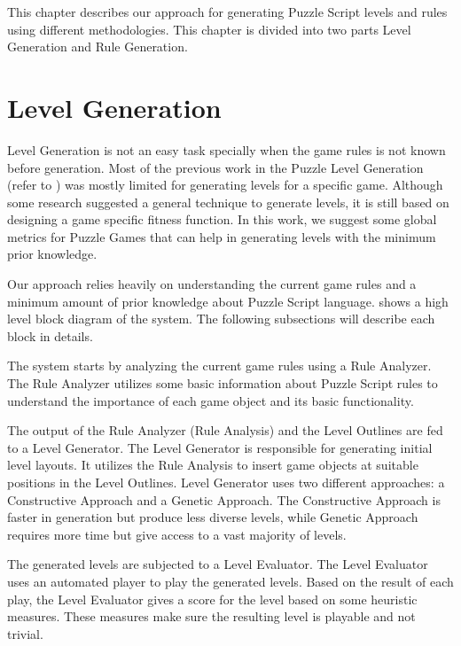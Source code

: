This chapter describes our approach for generating Puzzle Script levels and rules using different methodologies. This chapter is divided into two parts Level Generation and Rule Generation.

\section{Level Generation}
Level Generation is not an easy task specially when the game rules is not known before generation. Most of the previous work in the Puzzle Level Generation (refer to ) was mostly limited for generating levels for a specific game. Although some research suggested a general technique to generate levels, it is still based on designing a game specific fitness function. In this work, we suggest some global metrics for Puzzle Games that can help in generating levels with the minimum prior knowledge.\\\par

Our approach relies heavily on understanding the current game rules and a minimum amount of prior knowledge about Puzzle Script language.  shows a high level block diagram of the system. The following subsections will describe each block in details.


The system starts by analyzing the current game rules using a Rule Analyzer. The Rule Analyzer utilizes some basic information about Puzzle Script rules to understand the importance of each game object and its basic functionality.\\\par

The output of the Rule Analyzer (Rule Analysis) and the Level Outlines are fed to a Level Generator. The Level Generator is responsible for generating initial level layouts. It utilizes the Rule Analysis to insert game objects at suitable positions in the Level Outlines. Level Generator uses two different approaches: a Constructive Approach and a Genetic Approach. The Constructive Approach is faster in generation but produce less diverse levels, while Genetic Approach requires more time but give access to a vast majority of levels.\\\par

The generated levels are subjected to a Level Evaluator. The Level Evaluator uses an automated player to play the generated levels. Based on the result of each play, the Level Evaluator gives a score for the level based on some heuristic measures. These measures make sure the resulting level is playable and not trivial.\\\par

